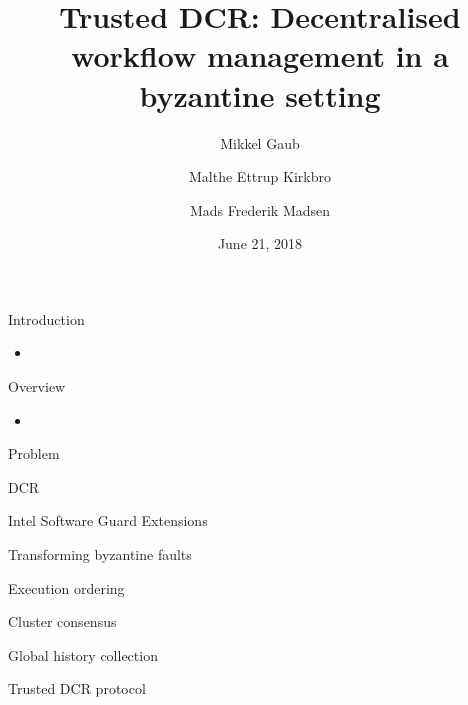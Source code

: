 \documentclass{beamer}
\title{Trusted DCR: Decentralised workflow management in a byzantine setting}
\author{Mikkel Gaub \and Malthe Ettrup Kirkbro \and Mads Frederik Madsen}
\date{June 21, 2018}
\begin{document}
\maketitle

\begin{frame}{Introduction}%
    \begin{itemize}
    	\item 
    \end{itemize}
\end{frame}

\begin{frame}{Overview}%
	\begin{itemize}
		\item 
	\end{itemize}
\end{frame}

\begin{frame}{Problem}%
    
\end{frame}

\begin{frame}{DCR}%
	
\end{frame}

\begin{frame}{Intel Software Guard Extensions}%
	
\end{frame}

\begin{frame}{Transforming byzantine faults} %
    
\end{frame}

\begin{frame}{Execution ordering}%
    
\end{frame}

\begin{frame}{Cluster consensus}%
	
\end{frame}

\begin{frame}{Global history collection}%
    
\end{frame}

\begin{frame}{Trusted DCR protocol}%
    
\end{frame}
\end{document}
